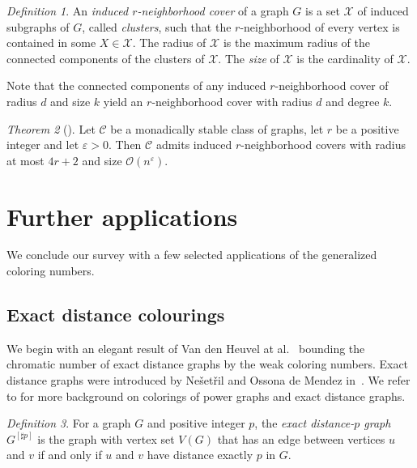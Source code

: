 \documentclass[1p,number,a4paper]{elsarticle}
\theoremstyle{remark}
\newcommand{\Oof}{\mathcal{O}}
\newcommand{\Cc}{\mathscr{C}}
\newcommand{\Xx}{\mathcal{X}}
\renewcommand{\epsilon}{\varepsilon}
\newtheorem{theorem}{Theorem}[section]
\newtheorem{definition}[theorem]{Definition}
\begin{document}
\begin{definition}
    An \emph{induced $r$-neighborhood cover} of a graph $G$ is a set $\Xx$ of 
    induced subgraphs of $G$, called \emph{clusters}, such that the $r$-neighborhood of every vertex is contained in some $X\in \Xx$. The radius of $\Xx$ is the 
    maximum radius of the connected components of the clusters of $\Xx$. The \emph{size} of $\Xx$ is the cardinality of $\Xx$.
\end{definition}

Note that the connected components of any induced $r$-neighborhood cover of radius $d$ and size $k$ yield an $r$-neighborhood cover with radius $d$ and degree $k$.

\begin{theorem}[\cite{braunfeld2024decomposition}]
    Let $\Cc$ be a monadically stable class of graphs, let $r$ be a positive integer and let $\epsilon>0$. Then $\Cc$ admits induced $r$-neighborhood covers with radius at most $4r+2$ and size $\Oof(n^\epsilon)$. 
\end{theorem}

\section{Further applications}\label{sec:further-applications}

We conclude our survey with a few selected applications of the generalized coloring numbers. 

\subsection{Exact distance colourings}\label{sec:exact-distance}

We begin with an elegant result of Van den Heuvel at al.~\cite{van2019chromatic} bounding the chromatic number of exact distance graphs by the weak coloring numbers.
Exact distance graphs were introduced by Ne\v{s}et\v{r}il and Ossona de Mendez in~\cite{nevsetril2012sparsity}. We refer to \cite{nevsetril2012sparsity,van2019chromatic} for more background on colorings of power graphs and exact distance graphs. 

\begin{definition}
For a graph $G$ and positive integer $p$, the \emph{exact
distance-$p$ graph} $G^{[\sharp p]}$ is the graph with vertex set $V(G)$ that has an edge between vertices $u$ and $v$ if and only if $u$ and $v$ have distance exactly $p$ in $G$. 
\end{definition}
\end{document}
